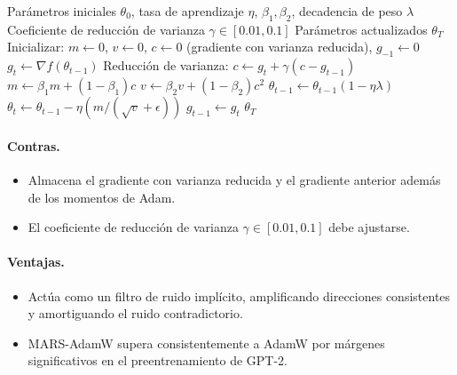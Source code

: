 \begin{algorithm}[H]
\caption{MARS (Haciendo Brillar las Tasas de Aprendizaje Adaptativas)}
\label{alg:mars}
\begin{algorithmic}[1]
\Require Parámetros iniciales $\theta_0$, tasa de aprendizaje $\eta$, $\beta_1, \beta_2$, decadencia de peso $\lambda$
\Require Coeficiente de reducción de varianza $\gamma \in [0.01, 0.1]$
\Ensure Parámetros actualizados $\theta_T$
\State Inicializar: $m \gets 0$, $v \gets 0$, $c \gets 0$ (gradiente con varianza reducida), $g_{-1} \gets 0$
    \State $g_t \gets \nabla f(\theta_{t-1})$
    \State Reducción de varianza: $c \gets g_t + \gamma(c - g_{t-1})$
    \State $m \gets \beta_1 m + (1-\beta_1) c$
    \State $v \gets \beta_2 v + (1-\beta_2) c^2$
        \State $\theta_{t-1} \gets \theta_{t-1}(1 - \eta\lambda)$
    \EndIf
    \State $\theta_t \gets \theta_{t-1} - \eta (m / (\sqrt{v} + \epsilon))$
    \State $g_{t-1} \gets g_t$
\EndFor
\Return $\theta_T$
\end{algorithmic}
\end{algorithm}

\paragraph{Contras.}
\begin{itemize}[leftmargin=*]
\item Almacena el gradiente con varianza reducida y el gradiente anterior además de los momentos de Adam.
\item El coeficiente de reducción de varianza $\gamma \in [0.01, 0.1]$ debe ajustarse.
\end{itemize}

\paragraph{Ventajas.}
\begin{itemize}[leftmargin=*]
\item Actúa como un filtro de ruido implícito, amplificando direcciones consistentes y amortiguando el ruido contradictorio.
\item MARS-AdamW supera consistentemente a AdamW por márgenes significativos en el preentrenamiento de GPT-2.
\end{itemize}

